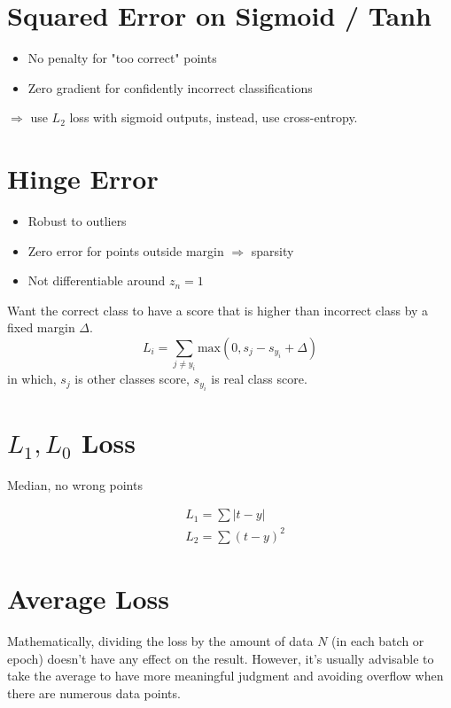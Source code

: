 \section{Squared Error on Sigmoid / Tanh}
\begin{itemize}
	\item No penalty for "too correct" points
	\item Zero gradient for confidently incorrect classifications
\end{itemize}
$\Rightarrow$  use $L_2$ loss with sigmoid outputs, instead, use cross-entropy.

\section{Hinge Error}
\begin{itemize}
	\item Robust to outliers
	\item Zero error for points outside margin $\Rightarrow$ sparsity
	\item Not differentiable around $z_n = 1$
\end{itemize}
\note Want the correct class to have a score that is higher than incorrect class by a fixed margin $\Delta$.
\begin{equation}
	L_i = \sum_{j \neq y_i} \text{max}(0, s_j - s_{y_i} + \Delta)
\end{equation}
in which, $s_j$ is other classes score, $s_{y_i}$ is real class score.

\section{$L_1, L_0$ Loss}
Median, no wrong points

\begin{align}
	&L_1 = \sum |t-y| \\
	&L_2 = \sum (t-y)^2
\end{align}

\section{Average Loss}
Mathematically, dividing the loss by the amount of data $N$ (in each batch or epoch) doesn't have any effect on the result. However, it's usually advisable to take the average to have more meaningful judgment and avoiding overflow when there are numerous data points.